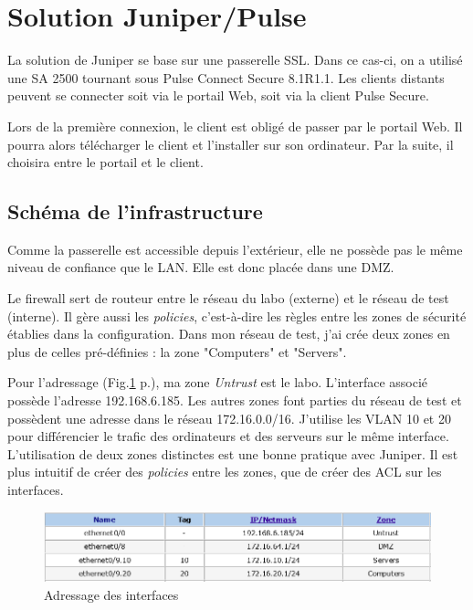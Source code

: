 \section{Solution Juniper/Pulse}
La solution de Juniper se base sur une passerelle SSL.
Dans ce cas-ci, on a utilisé une SA 2500 tournant sous Pulse Connect Secure 8.1R1.1.
Les clients distants peuvent se connecter soit via le portail Web, soit via la client Pulse Secure.

Lors de la première connexion, le client est obligé de passer par le portail Web.
Il pourra alors télécharger le client et l'installer sur son ordinateur.
Par la suite, il choisira entre le portail et le client.

\subsection{Schéma de l'infrastructure}
Comme la passerelle est accessible depuis l'extérieur, elle ne possède pas le même niveau de confiance que le LAN.
Elle est donc placée dans une DMZ.

Le firewall sert de routeur entre le réseau du labo (externe) et le réseau de test (interne).
Il gère aussi les \textit{policies}, c'est-à-dire les règles entre les zones de sécurité établies dans la configuration.
Dans mon réseau de test, j'ai crée deux zones en plus de celles pré-définies : la zone "Computers" et "Servers".

Pour l'adressage (Fig.\ref{fig:if} p.\pageref{fig:if}), ma zone \textit{Untrust} est le labo. L'interface associé possède l'adresse 192.168.6.185.
Les autres zones font parties du réseau de test et possèdent une adresse dans le réseau 172.16.0.0/16.
J'utilise les VLAN 10 et 20 pour différencier le trafic des ordinateurs et des serveurs sur le même interface.
L'utilisation de deux zones distinctes est une bonne pratique avec Juniper. 
Il est plus intuitif de créer des \textit{policies} entre les zones, que de créer des ACL sur les interfaces.
\begin{figure}[ht]
	\centering
	\includegraphics[width=16cm]{juniper/interfaces.png}
	\caption{Adressage des interfaces}
	\label{fig:if}
\end{figure}


